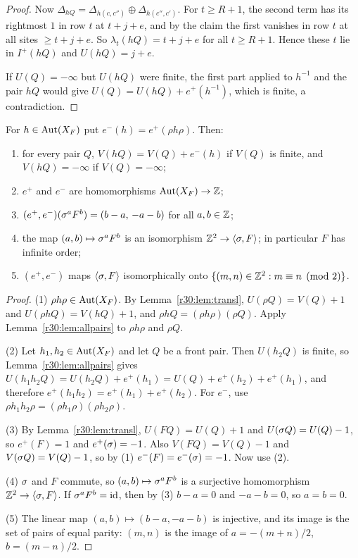 \begin{proof}
Now $\Delta_{hQ}=\Delta_{h(c,c'')}\oplus\Delta_{h(c'',c')}$. For $t\ge R+1$, the second term has its rightmost $1$ in row $t$ at $t+j+e$, and by the claim the first vanishes in row $t$ at all sites $\ge t+j+e$. So $\lambda_t(hQ)=t+j+e$ for all $t\ge R+1$. Hence these $t$ lie in $I^+(hQ)$ and $U(hQ)=j+e$.

If $U(Q)=-\infty$ but $U(hQ)$ were finite, the first part applied to $h^{-1}$ and the pair $hQ$ would give $U(Q)=U(hQ)+e^+(h^{-1})$, which is finite, a contradiction.
\end{proof}

\begin{corollary}\label{r30:cor:offsets}
For $h\in\operatorname{Aut}(X_F)$ put $e^-(h)=e^+(\rho h\rho)$. Then:
\begin{enumerate}
\item for every pair $Q$, $V(hQ)=V(Q)+e^-(h)$ if $V(Q)$ is finite, and $V(hQ)=-\infty$ if $V(Q)=-\infty$;
\item $e^+$ and $e^-$ are homomorphisms $\operatorname{Aut}(X_F)\to\mathbb{Z}$;
\item $(e^+,e^-)(\sigma^aF^b)=(b-a,\,-a-b)$ for all $a,b\in\mathbb{Z}$;
\item the map $(a,b)\mapsto\sigma^aF^b$ is an isomorphism $\mathbb{Z}^2\to\langle\sigma,F\rangle$; in particular $F$ has infinite order;
\item $(e^+,e^-)$ maps $\langle\sigma,F\rangle$ isomorphically onto $\{(m,n)\in\mathbb{Z}^2:m\equiv n\pmod2\}$.
\end{enumerate}
\end{corollary}

\begin{proof}
(1) $\rho h\rho\in\operatorname{Aut}(X_F)$. By Lemma~\ref{r30:lem:transl}, $U(\rho Q)=V(Q)+1$ and $U(\rho hQ)=V(hQ)+1$, and $\rho hQ=(\rho h\rho)(\rho Q)$. Apply Lemma~\ref{r30:lem:allpairs} to $\rho h\rho$ and $\rho Q$.

(2) Let $h_1,h_2\in\operatorname{Aut}(X_F)$ and let $Q$ be a front pair. Then $U(h_2Q)$ is finite, so Lemma~\ref{r30:lem:allpairs} gives $U(h_1h_2Q)=U(h_2Q)+e^+(h_1)=U(Q)+e^+(h_2)+e^+(h_1)$, and therefore $e^+(h_1h_2)=e^+(h_1)+e^+(h_2)$. For $e^-$, use $\rho h_1h_2\rho=(\rho h_1\rho)(\rho h_2\rho)$.

(3) By Lemma~\ref{r30:lem:transl}, $U(FQ)=U(Q)+1$ and $U(\sigma Q)=U(Q)-1$, so $e^+(F)=1$ and $e^+(\sigma)=-1$. Also $V(FQ)=V(Q)-1$ and $V(\sigma Q)=V(Q)-1$, so by (1) $e^-(F)=e^-(\sigma)=-1$. Now use (2).

(4) $\sigma$ and $F$ commute, so $(a,b)\mapsto\sigma^aF^b$ is a surjective homomorphism $\mathbb{Z}^2\to\langle\sigma,F\rangle$. If $\sigma^aF^b=\mathrm{id}$, then by (3) $b-a=0$ and $-a-b=0$, so $a=b=0$.

(5) The linear map $(a,b)\mapsto(b-a,-a-b)$ is injective, and its image is the set of pairs of equal parity: $(m,n)$ is the image of $a=-(m+n)/2$, $b=(m-n)/2$.
\end{proof}

